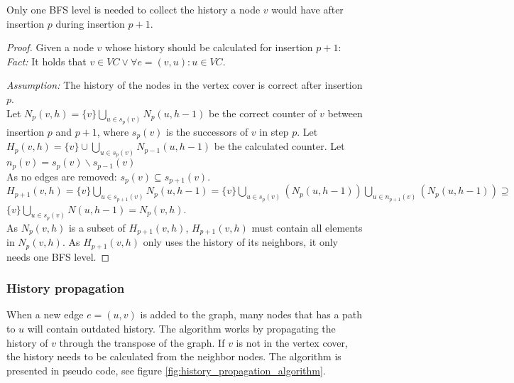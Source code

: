 \begin{lemma} Only one BFS level is needed to collect the history a node $v$ would have after insertion $p$ during insertion $p+1$. 
\label{lemma:partial_history_calculation}

\begin{proof} Given a node $v$ whose history should be calculated for insertion $p+1$:\\

\noindent\textit{Fact:} It holds that $v \in VC \vee \forall e = (v,u) : u \in VC$.

\noindent\textit{Assumption:} The history of the nodes in the vertex cover is correct after insertion $p$.\\ 

\noindent Let $N_p(v,h) = \{v\}\bigcup\limits_{u \in s_p(v)} N_p(u,h-1) $ be the correct counter of $v$ between insertion $p$ and $p+1$, where $s_p(v)$ is the successors of $v$ in step $p$. Let $H_p(v,h) = \{v\}\cup\bigcup\limits_{u\in s_{p}(v)}N_{p-1}(u,h-1)$ be the calculated counter. Let $n_p(v)=s_p(v)\backslash s_{p-1}(v)$\\


\noindent As no edges are removed: 
$s_p(v) \subseteq s_{p+1}(v)$.\\ 
$H_{p+1}(v,h) = \{v\}\bigcup\limits_{u\in s_{p+1}(v)}N_{p}(u,h-1) = \{v\}\bigcup\limits_{u\in s_{p}(v)}(N_{p}(u,h-1)) \bigcup\limits_{u\in n_{p+1}(v)}(N_{p}(u,h-1)) \supseteq $\\ $\{v\}\bigcup\limits_{u \in s_p(v)} N(u,h-1) = N_p(v,h)$. \\

\noindent As $N_p(v,h)$ is a subset of $H_{p+1}(v,h)$, $H_{p+1}(v,h)$ must contain all elements in $N_p(v,h)$. As $H_{p+1}(v,h)$ only uses the history of its neighbors, it only needs one BFS level.

\end{proof} 
\end{lemma}

\subsubsection{History propagation}

When a new edge $e = (u,v)$ is added to the graph, many nodes that has a path to $u$ will contain outdated history. The algorithm works by propagating the history of $v$ through the transpose of the graph. If $v$ is not in the vertex cover, the history needs to be calculated from the neighbor nodes. The algorithm is presented in pseudo code, see figure \ref{fig:history_propagation_algorithm}.

